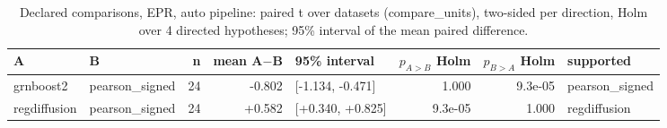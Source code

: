 \begin{table}[H]\centering\small
\caption{Declared comparisons, EPR, auto pipeline: paired t over datasets (compare\_units), two-sided per direction, Holm over 4 directed hypotheses; 95\% interval of the mean paired difference.}
\begin{tabular}{llrrlrrl}\toprule
A & B & n & mean A$-$B & 95\% interval & $p_{A>B}$ Holm & $p_{B>A}$ Holm & supported \\ \midrule
grnboost2 & pearson\_signed & 24 & -0.802 & [-1.134, -0.471] & 1.000 & 9.3e-05 & pearson\_signed \\
regdiffusion & pearson\_signed & 24 & +0.582 & [+0.340, +0.825] & 9.3e-05 & 1.000 & regdiffusion \\
\bottomrule\end{tabular}\end{table}

